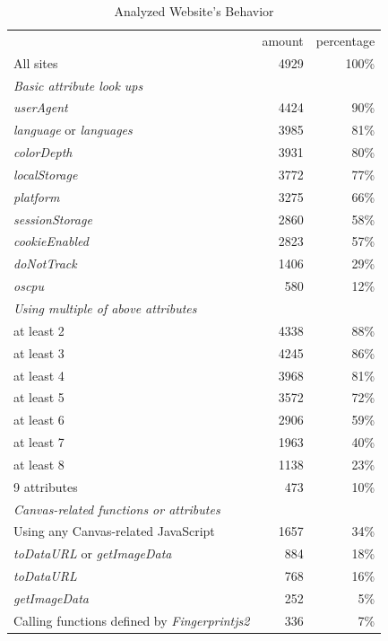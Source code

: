 \documentclass[
    fontsize=12pt,
    headings=small,
    parskip=half,
    bibliography=totoc,
    numbers=noenddot,
    open=any
    ]{scrreprt}
\begin{document}
\renewcommand{\arraystretch}{1.2}
\begin{table}
\centering
\caption{Analyzed Website's Behavior}
\begin{tabular}{l r r}
    \toprule
    & amount & percentage \\
    All sites & 4929 & 100\% \\
    \midrule
    \textit{Basic attribute look ups} & & \\
    \textit{userAgent} & 4424 & 90\% \\ %
    \textit{language} or \textit{languages} & 3985 & 81\% \\ %
    \textit{colorDepth} & 3931 & 80\% \\ %
    \textit{localStorage} & 3772 & 77\% \\
    \textit{platform} & 3275 & 66\% \\ %
    \textit{sessionStorage} & 2860 & 58\% \\
    \textit{cookieEnabled} & 2823 & 57\% \\ %
    \textit{doNotTrack} & 1406 & 29\% \\ %
    \textit{oscpu} & 580 & 12\% \\ %
    \midrule
    \textit{Using multiple of above attributes} & & \\
    at least 2 & 4338 & 88\% \\
    at least 3 & 4245 & 86\% \\
    at least 4 & 3968 & 81\% \\
    at least 5 & 3572 & 72\% \\
    at least 6 & 2906 & 59\% \\
    at least 7 & 1963 & 40\% \\
    at least 8 & 1138 & 23\% \\
    9 attributes & 473 & 10\% \\
    \midrule
    \textit{Canvas-related functions or attributes} & & \\
    Using any Canvas-related JavaScript & 1657 & 34\% \\ %
    \textit{toDataURL} or \textit{getImageData} & 884 & 18\% \\ %
    \textit{toDataURL} & 768 & 16\% \\ %
    \textit{getImageData} & 252 & 5\% \\ %
    \midrule
    Calling functions defined by \textit{Fingerprintjs2} & 336 & 7\% \\ %
    \bottomrule
\end{tabular}
\label{table:dataprops}
\end{table}
\end{document}
